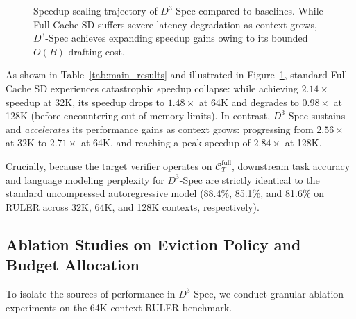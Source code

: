 \documentclass[runningheads]{llncs}
\begin{document}
\begin{figure}[t]
\centering
{}
\caption{Speedup scaling trajectory of $D^3$-Spec compared to baselines. While Full-Cache SD suffers severe latency degradation as context grows, $D^3$-Spec achieves expanding speedup gains owing to its bounded $O(B)$ drafting cost.}
\label{fig:speedup_trend}
\end{figure}

As shown in Table~\ref{tab:main_results} and illustrated in Figure~\ref{fig:speedup_trend}, standard Full-Cache SD experiences catastrophic speedup collapse: while achieving $2.14\times$ speedup at 32K, its speedup drops to $1.48\times$ at 64K and degrades to $0.98\times$ at 128K (before encountering out-of-memory limits). In contrast, $D^3$-Spec sustains and \textit{accelerates} its performance gains as context grows: progressing from $2.56\times$ at 32K to $2.71\times$ at 64K, and reaching a peak speedup of $\mathbf{2.84\times}$ at 128K.

Crucially, because the target verifier operates on $\mathcal{C}_T^{\text{full}}$, downstream task accuracy and language modeling perplexity for $D^3$-Spec are strictly identical to the standard uncompressed autoregressive model (88.4\%, 85.1\%, and 81.6\% on RULER across 32K, 64K, and 128K contexts, respectively).

\subsection{Ablation Studies on Eviction Policy and Budget Allocation}
To isolate the sources of performance in $D^3$-Spec, we conduct granular ablation experiments on the 64K context RULER benchmark.
\end{document}
